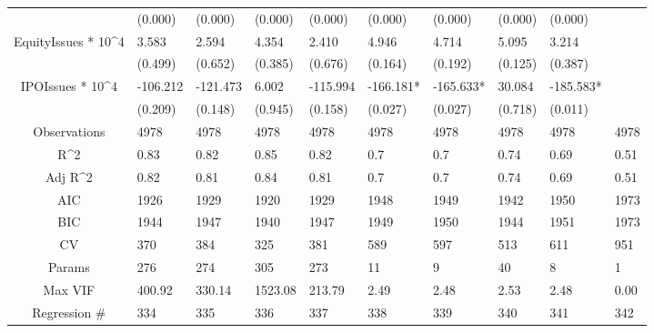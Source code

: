 \documentclass{article}
\begin{document}
\begin{table}[H]
\begin{tabular}{|clllllllll|}
   & (0.000) & (0.000) & (0.000) & (0.000) & (0.000) & (0.000) & (0.000) & (0.000) &  \\ 
  EquityIssues * 10^4 & 3.583 & 2.594 & 4.354 & 2.410 & 4.946 & 4.714 & 5.095 & 3.214 &  \\ 
   & (0.499) & (0.652) & (0.385) & (0.676) & (0.164) & (0.192) & (0.125) & (0.387) &  \\ 
  IPOIssues * 10^4 & -106.212 & -121.473 & 6.002 & -115.994 & -166.181* & -165.633* & 30.084 & -185.583* &  \\ 
   & (0.209) & (0.148) & (0.945) & (0.158) & (0.027) & (0.027) & (0.718) & (0.011) &  \\ 
  \hline 
 Observations & 4978 & 4978 & 4978 & 4978 & 4978 & 4978 & 4978 & 4978 & 4978 \\ 
  R^2 & 0.83 & 0.82 & 0.85 & 0.82 & 0.7 & 0.7 & 0.74 & 0.69 & 0.51 \\ 
  Adj R^2 & 0.82 & 0.81 & 0.84 & 0.81 & 0.7 & 0.7 & 0.74 & 0.69 & 0.51 \\ 
  AIC & 1926 & 1929 & 1920 & 1929 & 1948 & 1949 & 1942 & 1950 & 1973 \\ 
  BIC & 1944 & 1947 & 1940 & 1947 & 1949 & 1950 & 1944 & 1951 & 1973 \\ 
  CV & 370 & 384 & 325 & 381 & 589 & 597 & 513 & 611 & 951 \\ 
  Params & 276 & 274 & 305 & 273 & 11 & 9 & 40 & 8 & 1 \\ 
  Max VIF & 400.92 & 330.14 & 1523.08 & 213.79 & 2.49 & 2.48 & 2.53 & 2.48 & 0.00 \\ 
  Regression \# & 334 & 335 & 336 & 337 & 338 & 339 & 340 & 341 & 342 \\ 
   \hline
\end{tabular}
 
\end{table}
\end{document}
